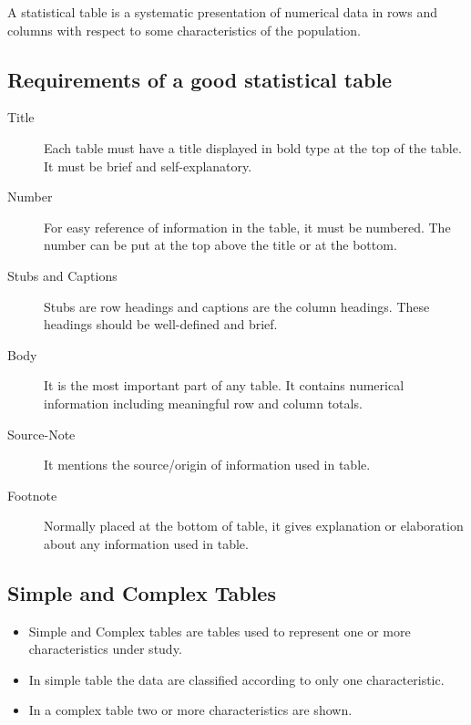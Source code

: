 \documentclass[
10pt, %
a4paper, %
]{report}
\begin{document}
A statistical table is a systematic presentation of numerical data in rows and columns with respect to some characteristics of the population.

\subsection*{Requirements of a good statistical table}
\begin{description}
\item[Title] Each table must have a title
displayed in bold type at the top of the table. It must
be brief and self-explanatory.
\item[Number] For easy reference of information in
the table, it must be numbered. The number can be
put at the top above the title or at the bottom.
\item [Stubs and Captions] Stubs are row headings and
captions are the column headings. These headings
should be well-defined and brief.
\item[Body] It is the most important part of any
table. It contains numerical information including
meaningful row and column totals.
\item[Source-Note] It mentions the source/origin of
information used in table.
\item[Footnote] Normally placed at the bottom of table, it gives explanation or elaboration about any information used in table.
\end{description}

\subsection*{Simple and Complex Tables}
\begin{itemize}
\item Simple and Complex tables are tables used to represent one or more characteristics under study.
\item In simple table the data are classified according to only one characteristic.
\item In a complex table two or more characteristics are shown.
\end{itemize}
\end{document}
